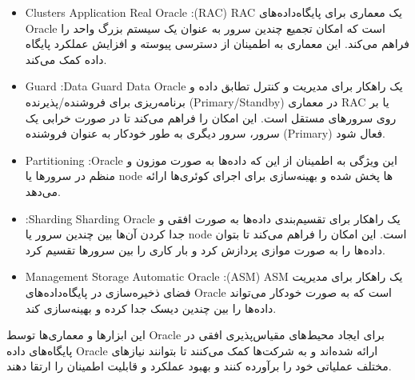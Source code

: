 \documentclass[a4paper,10pt]{article}
\begin{document}
    \begin{itemize}

        \item Clusters Application Real Oracle :(RAC) RAC یک معماری برای پایگاه‌داده‌های Oracle است که امکان تجمیع چندین سرور به عنوان یک سیستم بزرگ واحد را فراهم می‌کند. این معماری به اطمینان از دسترسی پیوسته و افزایش عملکرد پایگاه داده کمک می‌کند.

        \item Guard :Data Guard Data Oracle یک راهکار برای مدیریت و کنترل تطابق داده و برنامه‌ریزی برای فروشنده/پذیرنده (Primary/Standby) در معماری RAC یا بر روی سرورهای مستقل است. این امکان را فراهم می‌کند تا در صورت خرابی یک سرور، سرور دیگری به طور خودکار به عنوان فروشنده (Primary) فعال شود.

        \item Partitioning :Oracle این ویژگی به اطمینان از این که داده‌ها به صورت موزون و منظم در سرورها یا node ها پخش شده و بهینه‌سازی برای اجرای کوئری‌ها ارائه می‌دهد.

        \item :Sharding Sharding Oracle یک راهکار برای تقسیم‌بندی داده‌ها به صورت افقی و جدا کردن آن‌ها بین چندین سرور یا node است. این امکان را فراهم می‌کند تا بتوان داده‌ها را به صورت موازی پردازش کرد و بار کاری را بین سرورها تقسیم کرد.
        
        \item Management Storage Automatic Oracle :(ASM) ASM یک راهکار برای مدیریت فضای ذخیره‌سازی در پایگاه‌داده‌های Oracle است که به صورت خودکار می‌تواند داده‌ها را بین چندین دیسک جدا کرده و بهینه‌سازی کند.

    \end{itemize}

    این ابزارها و معماری‌ها توسط Oracle برای ایجاد محیط‌های مقیاس‌پذیری افقی در پایگاه‌های داده Oracle ارائه شده‌اند و به شرکت‌ها کمک می‌کنند تا بتوانند نیازهای مختلف عملیاتی خود را برآورده کنند و بهبود عملکرد و قابلیت اطمینان را ارتقا دهند.
\end{document}
